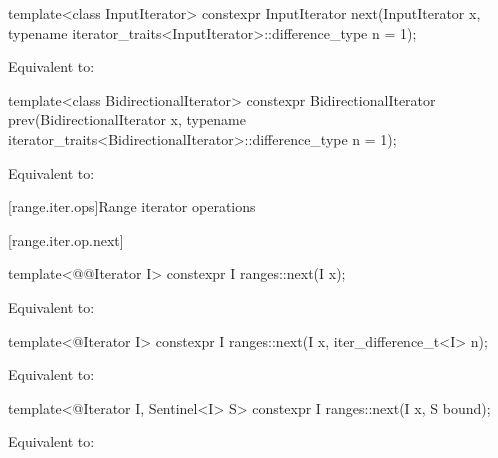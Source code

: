 \documentclass{wg21}
\begin{document}
%
\begin{itemdecl}
	template<class InputIterator>
	constexpr InputIterator next(InputIterator x,
	typename iterator_traits<InputIterator>::difference_type n = 1);
\end{itemdecl}

\begin{itemdescr}
	\pnum
	\effects Equivalent to: 
\end{itemdescr}

%
\begin{itemdecl}
	template<class BidirectionalIterator>
	constexpr BidirectionalIterator prev(BidirectionalIterator x,
	typename iterator_traits<BidirectionalIterator>::difference_type n = 1);
\end{itemdecl}

\begin{itemdescr}
	\pnum
	\effects Equivalent to: 
\end{itemdescr}

[range.iter.ops]{Range iterator operations}


[range.iter.op.next]{}

%
\begin{itemdecl}
	template<@@Iterator I>
	constexpr I ranges::next(I x);
\end{itemdecl}

\begin{itemdescr}
	\pnum
	\effects Equivalent to: 
\end{itemdescr}

%
\begin{itemdecl}
	template<@Iterator I>
	constexpr I ranges::next(I x, iter_difference_t<I> n);
\end{itemdecl}

\begin{itemdescr}
	\pnum
	\effects Equivalent to: 
\end{itemdescr}

%
\begin{itemdecl}
	template<@Iterator I, Sentinel<I> S>
	constexpr I ranges::next(I x, S bound);
\end{itemdecl}

\begin{itemdescr}
	\pnum
	\effects Equivalent to: 
\end{itemdescr}
\end{document}
